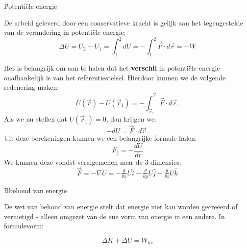 \begin{theo}{Potentiële energie}
    
    
    \noindent De arbeid geleverd door een conservatieve kracht is gelijk aan het tegengestelde van de verandering in potentiële energie: 
        \begin{equation*}
            \Delta U = U_2 - U_1 = \int_1^2dU = -\int_1^2 \Vec{F}\cdot d\Vec{r} = -W
        \end{equation*}
    
    \noindent Het is belangrijk om aan te halen dat het \textbf{verschil} in potentiële energie onafhankelijk is van het referentiestelsel. Hierdoor kunnen we de volgende redenering maken:
    \begin{equation*}
        U(\Vec{r}) - U(\Vec{r}_1) =  -\int_{\Vec{r}_1}^{\Vec{r}} \Vec{F}\cdot d\Vec{r}.
    \end{equation*}
    Als we nu stellen dat $U(\Vec{r}_1) = 0$, dan krijgen we:
    \begin{equation*}
            -dU = \Vec{F}\cdot d\Vec{r}.
    \end{equation*}
    Uit deze berekeningen kunnen we een belangrijke formule halen:
    \begin{equation*}
        F_{\parallel} = -\dfrac{dU}{dr}
    \end{equation*}
    We kunnen deze vondst veralgemenen naar de 3 dimensies:
    \begin{equation*}
        \Vec{F} = -\nabla U = -\tfrac{\theta}{\theta x}U\hat{i} - \tfrac{\theta}{\theta y}U\hat{j} - \tfrac{\theta}{\theta z}U\hat{k}
    \end{equation*}
    
\end{theo}

\begin{lem}{Bbehoud van energie}

    De wet van behoud van energie stelt dat energie niet kan worden gecreëerd of vernietigd - alleen omgezet van de ene vorm van energie in een andere. In formulevorm:
    
    \begin{equation*}
        \Delta K + \Delta U = W_{nc} 
    \end{equation*}
    \vspace{-0.5cm}
\end{lem}

